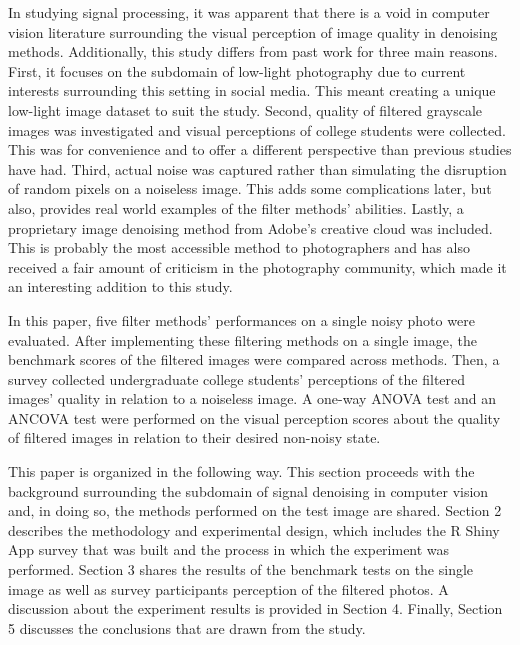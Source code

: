 \documentclass{ncjms}
\begin{document}
In studying signal processing, it was apparent that there is a void in computer vision literature surrounding the visual perception of image quality in denoising methods. Additionally, this study differs from past work for three main reasons. First, it focuses on the subdomain of low-light photography due to current interests surrounding this setting in social media. This meant creating a unique low-light image dataset to suit the study. Second, quality of filtered grayscale images was investigated and visual perceptions of college students were collected. This was for convenience and to offer a different perspective than previous studies have had. Third, actual noise was captured rather than simulating the disruption of random pixels on a noiseless image. This adds some complications later, but also, provides real world examples of the filter methods' abilities. Lastly, a proprietary image denoising method from Adobe's creative cloud was included. This is probably the most accessible method to photographers and has also received a fair amount of criticism in the photography community, which made it an interesting addition to this study.

In this paper, five filter methods' performances on a single noisy photo were evaluated. After implementing these filtering methods on a single image, the benchmark scores of the filtered images were compared across methods. Then, a survey collected undergraduate college students' perceptions of the filtered images' quality in relation to a noiseless image. A one-way ANOVA test and an ANCOVA test were performed on the visual perception scores about the quality of filtered images in relation to their desired non-noisy state.
	
This paper is organized in the following way. This section proceeds with the background surrounding the subdomain of signal denoising in computer vision and, in doing so, the methods performed on the test image are shared. Section 2 describes the methodology and experimental design, which includes the R Shiny App survey that was built and the process in which the experiment was performed. Section 3 shares the results of the benchmark tests on the single image as well as survey participants perception of the filtered photos. A discussion about the experiment results is provided in Section 4. Finally, Section 5 discusses the conclusions that are drawn from the study.
\end{document}
